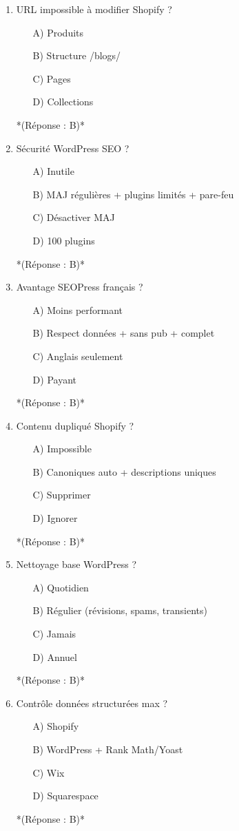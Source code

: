 \documentclass[12pt,a4paper,twoside]{report}
\begin{document}
\begin{enumerate}
\item URL impossible à modifier Shopify ?
\begin{itemize}
\item[A)] Produits
\item[B)] Structure /blogs/
\item[C)] Pages
\item[D)] Collections
\end{itemize}
*(Réponse : B)*

\item Sécurité WordPress SEO ?
\begin{itemize}
\item[A)] Inutile
\item[B)] MAJ régulières + plugins limités + pare-feu
\item[C)] Désactiver MAJ
\item[D)] 100 plugins
\end{itemize}
*(Réponse : B)*

\item Avantage SEOPress français ?
\begin{itemize}
\item[A)] Moins performant
\item[B)] Respect données + sans pub + complet
\item[C)] Anglais seulement
\item[D)] Payant
\end{itemize}
*(Réponse : B)*

\item Contenu dupliqué Shopify ?
\begin{itemize}
\item[A)] Impossible
\item[B)] Canoniques auto + descriptions uniques
\item[C)] Supprimer
\item[D)] Ignorer
\end{itemize}
*(Réponse : B)*

\item Nettoyage base WordPress ?
\begin{itemize}
\item[A)] Quotidien
\item[B)] Régulier (révisions, spams, transients)
\item[C)] Jamais
\item[D)] Annuel
\end{itemize}
*(Réponse : B)*

\item Contrôle données structurées max ?
\begin{itemize}
\item[A)] Shopify
\item[B)] WordPress + Rank Math/Yoast
\item[C)] Wix
\item[D)] Squarespace
\end{itemize}
*(Réponse : B)*


\end{enumerate}
\end{document}
